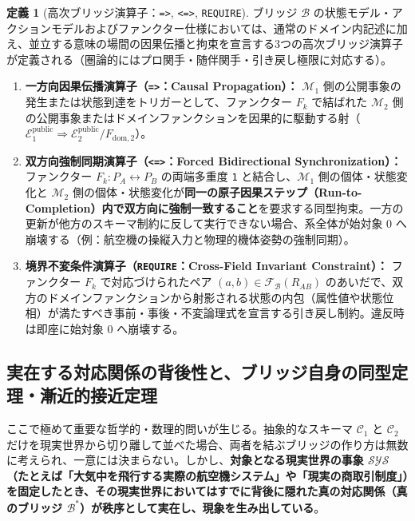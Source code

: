 \documentclass[11pt,a4paper]{ltjsarticle}
\theoremstyle{definition}
\newtheorem{definition}{定義}[section]
\theoremstyle{plain}
\theoremstyle{remark}
\begin{document}
\begin{definition}[高次ブリッジ演算子：\texttt{=>}, \texttt{<=>}, \texttt{REQUIRE}]\label{def:bridge-operators}
ブリッジ $\mathcal{B}$ の状態モデル・アクションモデルおよびファンクター仕様においては、通常のドメイン内記述に加え、並立する意味の場間の因果伝播と拘束を宣言する3つの高次ブリッジ演算子が定義される（圏論的にはプロ関手・随伴関手・引き戻し極限に対応する）。
\begin{enumerate}
    \item \textbf{一方向因果伝播演算子（\texttt{=>}：Causal Propagation）：}
    $\mathcal{M}_1$ 側の公開事象の発生または状態到達をトリガーとして、ファンクター $F_k$ で結ばれた $\mathcal{M}_2$ 側の公開事象またはドメインファンクションを因果的に駆動する射（$\mathcal{E}_1^{\mathrm{public}} \Rightarrow \mathcal{E}_2^{\mathrm{public}} / F_{\mathrm{dom}, 2}$）。
    \item \textbf{双方向強制同期演算子（\texttt{<=>}：Forced Bidirectional Synchronization）：}
    ファンクター $F_k : P_A \leftrightarrow P_B$ の両端多重度 \texttt{1} と結合し、$\mathcal{M}_1$ 側の個体・状態変化と $\mathcal{M}_2$ 側の個体・状態変化が\textbf{同一の原子因果ステップ（Run-to-Completion）内で双方向に強制一致すること}を要求する同型拘束。一方の更新が他方のスキーマ制約に反して実行できない場合、系全体が始対象 $0$ へ崩壊する（例：航空機の操縦入力と物理的機体姿勢の強制同期）。
    \item \textbf{境界不変条件演算子（\texttt{REQUIRE}：Cross-Field Invariant Constraint）：}
    ファンクター $F_k$ で対応づけられたペア $(a, b) \in \mathcal{F}_{\mathcal{B}}(R_{AB})$ のあいだで、双方のドメインファンクションから射影される状態の内包（属性値や状態位相）が満たすべき事前・事後・不変論理式を宣言する引き戻し制約。違反時は即座に始対象 $0$ へ崩壊する。
\end{enumerate}
\end{definition}

\subsection{実在する対応関係の背後性と、ブリッジ自身の同型定理・漸近的接近定理}
ここで極めて重要な哲学的・数理的問いが生じる。抽象的なスキーマ $\mathcal{C}_1$ と $\mathcal{C}_2$ だけを現実世界から切り離して並べた場合、両者を結ぶブリッジの作り方は無数に考えられ、一意には決まらない。しかし、\textbf{対象となる現実世界の事象 $\mathcal{SYS}$（たとえば「大気中を飛行する実際の航空機システム」や「現実の商取引制度」）を固定したとき、その現実世界においてはすでに背後に隠れた真の対応関係（真のブリッジ $\mathcal{B}^*$）が秩序として実在し、現象を生み出している}。
\end{document}
